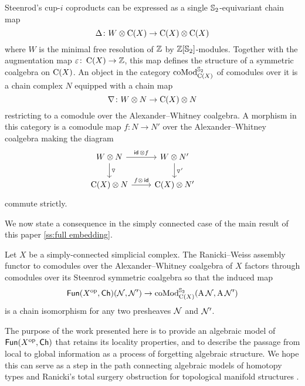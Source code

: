 Steenrod's cup-$i$ coproducts can be expressed as a single $\mathbb{S}_2$-equivariant chain map
\[
\operatorname{\Delta} \colon W \otimes \operatorname{C}(X) \to \operatorname{C}(X) \otimes \operatorname{C}(X)
\]
where $W$ is the minimal free resolution of $\mathbb{Z}$ by $\mathbb{Z}[\mathbb{S}_2]$-modules.
Together with the augmentation map $\varepsilon \colon \operatorname{C}(X) \to \mathbb{Z}$, this map defines the structure of a symmetric coalgebra on $\operatorname{C}(X)$.
An object in the category $\operatorname{coMod}_{\operatorname{C}(X)}^{\mathbb{S}_2}$ of comodules over it is a chain complex $N$ equipped with a chain map
\[
\nabla \colon W \otimes N \to \operatorname{C}(X) \otimes N
\]
restricting to a comodule over the Alexander--Whitney coalgebra.
A morphism in this category is a comodule map $f \colon N \to N'$ over the Alexander--Whitney coalgebra making the diagram
\[
\begin{tikzcd}
	W \ot N \arrow[d, "\triangledown"] \arrow[r, "\id\, \ot f"] &
	W \ot N' \arrow[d, "\triangledown'"] & \\
	\chains(X) \ot N \arrow[r, "f \ot\, \id"] &
	\chains(X) \ot N'
\end{tikzcd}
\]
commute strictly.

We now state a consequence in the simply connected case of the main result of this paper \cref{ss:full embedding}.

\begin{corollary*}
	Let $X$ be a simply-connected simplicial complex.
	The Ranicki--Weiss assembly functor to comodules over the Alexander--Whitney coalgebra of $X$ factors through comodules over its Steenrod symmetric coalgebra so that the induced map
	\[
	\mathsf{Fun}(X^{\mathrm{op}}, \mathsf{Ch})(\mathcal{N}, \mathcal{N}') \to \operatorname{coMod}^{\mathbb{S}_2}_{\operatorname{C}(X)}(\operatorname{A}\mathcal{N}, \operatorname{A}\mathcal{N}')
	\]
	is a chain isomorphism for any two presheaves $\mathcal{N}$ and $\mathcal{N}'$.
\end{corollary*}

The purpose of the work presented here is to provide an algebraic model of $\mathsf{Fun}(X^{\mathrm{op}},\mathsf{Ch})$ that retains its locality properties, and to describe the passage from local to global information as a process of forgetting algebraic structure.
We hope this can serve as a step in the path connecting algebraic models of homotopy types \cite{quillen1969rational, sullivan1977infinitesimal,mandell2001padic} and Ranicki's total surgery obstruction for topological manifold structures \cite{ranicki1979obstruction,ranicki1992topological,macko2013obstruction}.